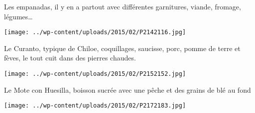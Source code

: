  Les empanadas, il y en a partout avec différentes garnitures, viande, fromage, légumes… \newline
 \newline
\centerline{\texttt{[image: ../wp-content/uploads/2015/02/P2142116.jpg]} } 
 \newline
 Le Curanto, typique de Chiloe, coquillages, saucisse, porc, pomme de terre et fèves, le tout cuit dans des pierres chaudes. \newline
 \newline
\centerline{\texttt{[image: ../wp-content/uploads/2015/02/P2152152.jpg]} } 
 \newline
 Le Mote con Huesilla, boisson sucrée avec une pêche et des grains de blé au fond \newline
 \newline
\centerline{\texttt{[image: ../wp-content/uploads/2015/02/P2172183.jpg]} } 
 \newline

\newpage
 
